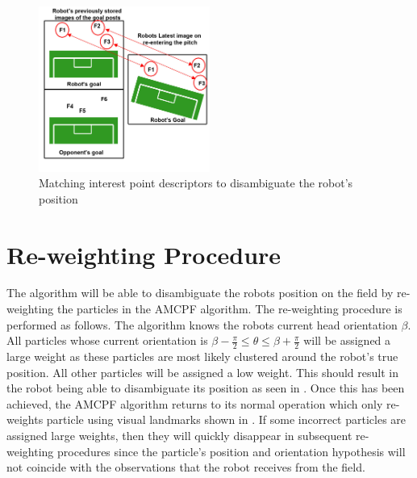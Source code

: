 \begin{figure}[h!] 
  \centering
    \includegraphics[width=0.5\textwidth]{../Drawings/localisation/featureMatching.jpg}
    \caption{Matching interest point descriptors to disambiguate the robot's position}
    \label{fig:featureMatching}
\end{figure}



\section{Re-weighting Procedure}
\label{sec:reweighting}
The algorithm will be able to disambiguate the robots position on the field by re-weighting the particles in the AMCPF algorithm. The re-weighting procedure is performed as follows. The algorithm knows the robots current head orientation $\beta$. All particles whose current orientation is $\beta -\frac{\pi}{2} \leq \theta \leq \beta + \frac{\pi}{2}$ will be assigned a large weight as these particles are most likely clustered around the robot's true position. All other particles will be assigned a low weight. This should result in the robot being able to disambiguate its position as seen in . Once this has been achieved, the AMCPF algorithm returns to its normal operation which only re-weights particle using visual landmarks shown in . If some incorrect particles are assigned large weights, then they will quickly disappear in subsequent re-weighting procedures since the particle's position and orientation hypothesis will not coincide with the observations that the robot receives from the field.\\


